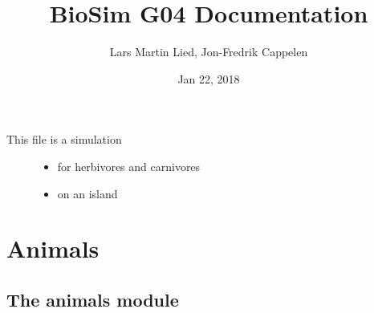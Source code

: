 \documentclass[a4paper,10pt,english]{sphinxmanual}
\title{BioSim G04 Documentation}
\date{Jan 22, 2018}
\author{Lars Martin Lied, Jon-Fredrik Cappelen}
\begin{document}
\maketitle
\sphinxtableofcontents
{}\label{\detokenize{index::doc}}

\begin{description}
\item[{This file is a simulation}] \leavevmode\begin{itemize}
\item {} 
for herbivores and carnivores

\item {} 
on an island

\end{itemize}

\end{description}


\chapter{Animals}
\label{\detokenize{animals:animals}}\label{\detokenize{animals:welcome-to-biosim-g04-s-documentation}}\label{\detokenize{animals::doc}}

\section{The animals module}
\label{\detokenize{animals:the-animals-module}}\label{\detokenize{animals:module-biosim.animals}}
\end{document}
